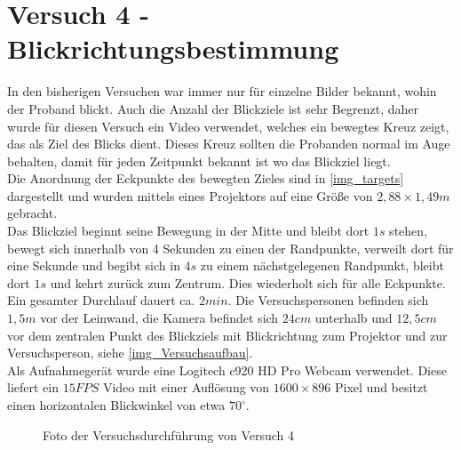 \section{Versuch 4 - Blickrichtungsbestimmung}
\label{VideoAnalyse}
In den bisherigen Versuchen war immer nur für einzelne Bilder bekannt, wohin der Proband blickt. Auch die Anzahl der Blickziele ist sehr Begrenzt, daher wurde für diesen Versuch ein Video verwendet, welches ein bewegtes Kreuz zeigt, das als Ziel des Blicks dient. Dieses Kreuz sollten die Probanden normal im Auge behalten, damit für jeden Zeitpunkt bekannt ist wo das Blickziel liegt.\\
Die Anordnung der Eckpunkte des bewegten Zieles sind in \autoref{img_targets} dargestellt und wurden mittels eines Projektors auf eine Größe von $2,88 \times 1,49 m$ gebracht.\\
Das Blickziel beginnt seine Bewegung in der Mitte und bleibt dort $1s$ stehen, bewegt sich innerhalb von 4 Sekunden zu einen der Randpunkte, verweilt dort für eine Sekunde und begibt sich in $4s$ zu einem nächstgelegenen Randpunkt, bleibt dort $1s$ und kehrt zurück zum Zentrum. Dies wiederholt sich für alle Eckpunkte. Ein gesamter Durchlauf dauert ca. $2min$.
\newpage
Die Versuchspersonen befinden sich $1,5m$ vor der Leinwand, die Kamera befindet sich $24cm$ unterhalb und $12,5cm$ vor dem zentralen Punkt des Blickziels mit Blickrichtung zum Projektor und zur Versuchsperson, siehe \autoref{img_Versuchsaufbau}.\\
Als Aufnahmegerät wurde eine Logitech c920 HD Pro Webcam verwendet. Diese liefert ein $15FPS$ Video mit einer Auflösung von $1600\times 896$ Pixel und besitzt einen horizontalen Blickwinkel von etwa $70^\circ$.\\
\begin{figure}
	\centering
	\caption{Foto der Versuchsdurchführung von Versuch 4}
	\label{img_Versuchsaufbau}
\end{figure}
